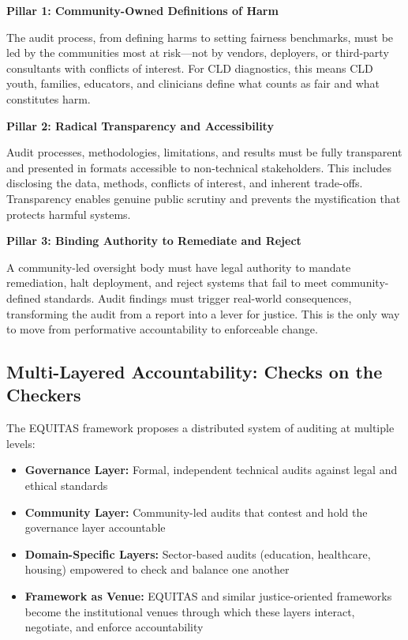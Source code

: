 \documentclass[12pt,letterpaper]{article}
\begin{document}
\begin{keyfindings}
\textbf{Pillar 1: Community-Owned Definitions of Harm}

The audit process, from defining harms to setting fairness benchmarks, must be led by the communities most at risk—not by vendors, deployers, or third-party consultants with conflicts of interest. For CLD diagnostics, this means CLD youth, families, educators, and clinicians define what counts as fair and what constitutes harm.

\textbf{Pillar 2: Radical Transparency and Accessibility}

Audit processes, methodologies, limitations, and results must be fully transparent and presented in formats accessible to non-technical stakeholders. This includes disclosing the data, methods, conflicts of interest, and inherent trade-offs. Transparency enables genuine public scrutiny and prevents the mystification that protects harmful systems.

\textbf{Pillar 3: Binding Authority to Remediate and Reject}

A community-led oversight body must have legal authority to mandate remediation, halt deployment, and reject systems that fail to meet community-defined standards. Audit findings must trigger real-world consequences, transforming the audit from a report into a lever for justice. This is the only way to move from performative accountability to enforceable change.
\end{keyfindings}

\subsection*{Multi-Layered Accountability: Checks on the Checkers}

The EQUITAS framework proposes a distributed system of auditing at multiple levels:

\begin{itemize}[leftmargin=*,noitemsep,topsep=2pt]
    \item \textbf{Governance Layer:} Formal, independent technical audits against legal and ethical standards
    \item \textbf{Community Layer:} Community-led audits that contest and hold the governance layer accountable
    \item \textbf{Domain-Specific Layers:} Sector-based audits (education, healthcare, housing) empowered to check and balance one another
    \item \textbf{Framework as Venue:} EQUITAS and similar justice-oriented frameworks become the institutional venues through which these layers interact, negotiate, and enforce accountability
\end{itemize}
\end{document}

